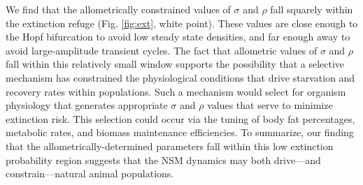 \documentclass{pnastwo}
\begin{document}
\begin{article}
We find that the allometrically constrained values of $\sigma$ and $\rho$ fall squarely within the extinction refuge (Fig. \ref{fig:ext}, white point). 
These values are close enough to the Hopf bifurcation to avoid low steady state densities, and far enough away to avoid large-amplitude transient cycles. 
The fact that allometric values of $\sigma$ and $\rho$ fall within this relatively small window supports the possibility that a selective mechanism has constrained the physiological conditions that drive starvation and recovery rates within populations.  
Such a mechanism would select for organism physiology that generates appropriate $\sigma$ and $\rho$ values that serve to minimize extinction risk.  
This selection could occur via the tuning of body fat percentages, metabolic rates, and biomass maintenance efficiencies.
To summarize, our finding that the allometrically-determined parameters fall within this low extinction probability region suggests that the NSM dynamics may both drive---and constrain---natural animal populations.\\







\end{article}
\end{document}
